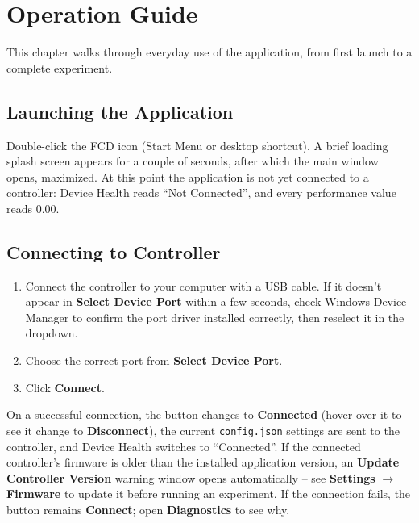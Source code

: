 \documentclass[12pt]{report}
\begin{document}
\chapter{Operation Guide}
This chapter walks through everyday use of the application, from first launch to a complete experiment.

\section{Launching the Application}
Double-click the FCD icon (Start Menu or desktop shortcut). A brief loading splash screen appears for a couple of seconds, after which the main window opens, maximized. At this point the application is not yet connected to a controller: Device Health reads ``Not Connected'', and every performance value reads 0.00.

\section{Connecting to Controller}
\label{sec:connecting}
\begin{enumerate}
    \item Connect the controller to your computer with a USB cable. If it doesn't appear in \textbf{Select Device Port} within a few seconds, check Windows Device Manager to confirm the port driver installed correctly, then reselect it in the dropdown.
    \item Choose the correct port from \textbf{Select Device Port}.
    \item Click \textbf{Connect}.
\end{enumerate}
On a successful connection, the button changes to \textbf{Connected} (hover over it to see it change to \textbf{Disconnect}), the current \texttt{config.json} settings are sent to the controller, and Device Health switches to ``Connected''. If the connected controller's firmware is older than the installed application version, an \textbf{Update Controller Version} warning window opens automatically -- see \textbf{Settings} $\rightarrow$ \textbf{Firmware} to update it before running an experiment. If the connection fails, the button remains \textbf{Connect}; open \textbf{Diagnostics} to see why.
\end{document}
